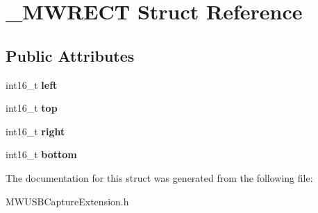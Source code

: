 \hypertarget{struct__MWRECT}{\section{\-\_\-\-M\-W\-R\-E\-C\-T Struct Reference}
\label{struct__MWRECT}
}
\subsection*{Public Attributes}
\begin{DoxyCompactItemize}
\item 
\hypertarget{struct__MWRECT_a43672eb924923720de9f859cff95105a}{int16\-\_\-t {\bfseries left}}\label{struct__MWRECT_a43672eb924923720de9f859cff95105a}

\item 
\hypertarget{struct__MWRECT_a39790e727c688c672a292e9a7140531a}{int16\-\_\-t {\bfseries top}}\label{struct__MWRECT_a39790e727c688c672a292e9a7140531a}

\item 
\hypertarget{struct__MWRECT_a820478c8fecda4dc1612cc2bae21a9a0}{int16\-\_\-t {\bfseries right}}\label{struct__MWRECT_a820478c8fecda4dc1612cc2bae21a9a0}

\item 
\hypertarget{struct__MWRECT_a0302fb45e667b4ffb96d7cef6c155b64}{int16\-\_\-t {\bfseries bottom}}\label{struct__MWRECT_a0302fb45e667b4ffb96d7cef6c155b64}

\end{DoxyCompactItemize}


The documentation for this struct was generated from the following file\-:\begin{DoxyCompactItemize}
\item 
M\-W\-U\-S\-B\-Capture\-Extension.\-h\end{DoxyCompactItemize}
